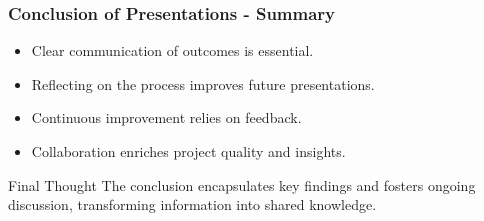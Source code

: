 \documentclass[aspectratio=169]{beamer}
\begin{document}
\begin{frame}[fragile]
    \frametitle{Conclusion of Presentations - Summary}
    \begin{itemize}
        \item Clear communication of outcomes is essential.
        \item Reflecting on the process improves future presentations.
        \item Continuous improvement relies on feedback.
        \item Collaboration enriches project quality and insights.
    \end{itemize}
    \begin{block}{Final Thought}
        The conclusion encapsulates key findings and fosters ongoing discussion, transforming information into shared knowledge.
    \end{block}
\end{frame}
\end{document}
